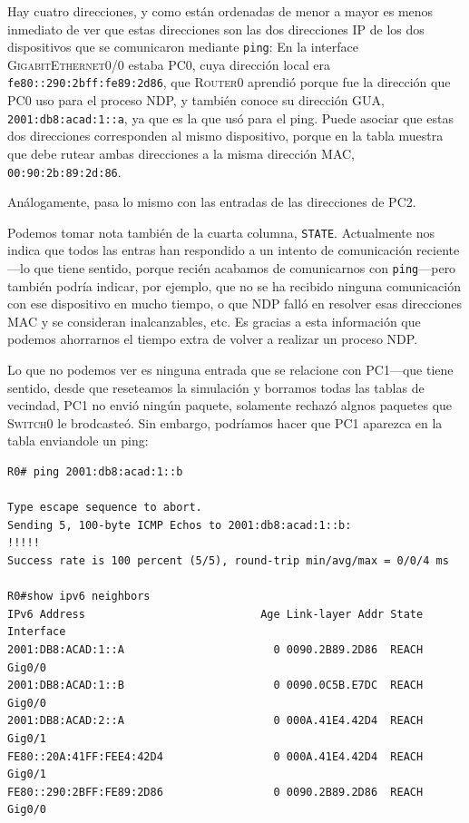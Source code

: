 \documentclass[a4paper,10pt]{corsage}
\makeatletter
\newcommand{\ipaddress}[1]{\texttt{#1}}
\newcommand{\macaddress}[1]{\ipaddress{#1}}
\newcommand{\devname}[1]{\textsc{#1}}
\newcommand*{\@doendeq}{%
	\everypar{{\setbox\z@\lastbox}\everypar{}}%
}
\newenvironment{console}{%
	\begin{tcolorbox}[
		left skip=1cm,
		right skip=1Cm,
		left=8pt,
		right=8pt,
		top=2.5\parskip,
		bottom=2\parskip,
		colback=gray!10,
		colframe=gray!40,
		boxrule=0pt,
		leftrule=4pt,
		sharp corners=all,
		fontupper=\ttfamily\flushleft\footnotesize
	]%
}{%
	\end{tcolorbox}%
	\ignorespacesafterend\par\noindent\aftergroup\@doendeq%
}
\makeatother
\begin{document}
		Hay cuatro direcciones, y como están ordenadas de menor a mayor es menos inmediato de ver que estas direcciones son las dos direcciones IP de los dos dispositivos que se comunicaron mediante \texttt{ping}:  En la interface \devname{GigabitEthernet0/0} estaba \devname{PC0}, cuya dirección local era \ipaddress{fe80::290:2bff:fe89:2d86}, que \devname{Router0} aprendió porque fue la dirección que \devname{PC0} uso para el proceso NDP, y también conoce su dirección GUA, \ipaddress{2001:db8:acad:1::a}, ya que es la que usó para el ping.  Puede asociar que estas dos direcciones corresponden al mismo dispositivo, porque en la tabla muestra que debe rutear ambas direcciones a la misma dirección MAC, \macaddress{00:90:2b:89:2d:86}.

		Análogamente, pasa lo mismo con las entradas de las direcciones de \devname{PC2}.

		Podemos tomar nota también de la cuarta columna, \texttt{STATE}.  Actualmente nos indica que todos las entras han respondido a un intento de comunicación reciente---lo que tiene sentido, porque recién acabamos de comunicarnos con \texttt{ping}---pero también podría indicar, por ejemplo, que no se ha recibido ninguna comunicación con ese dispositivo en mucho tiempo, o que NDP falló en resolver esas direcciones MAC y se consideran inalcanzables, etc.  Es gracias a esta información que podemos ahorrarnos el tiempo extra de volver a realizar un proceso NDP.

		Lo que no podemos ver es ninguna entrada que se relacione con \devname{PC1}---que tiene sentido, desde que reseteamos la simulación y borramos todas las tablas de vecindad, \devname{PC1} no envió ningún paquete, solamente rechazó algnos paquetes que \devname{Switch0} le brodcasteó.  Sin embargo, podríamos hacer que \devname{PC1} aparezca en la tabla enviandole un ping:
		\begin{console}
			\begin{verbatim}R0# ping 2001:db8:acad:1::b

Type escape sequence to abort.
Sending 5, 100-byte ICMP Echos to 2001:db8:acad:1::b:
!!!!!
Success rate is 100 percent (5/5), round-trip min/avg/max = 0/0/4 ms

R0#show ipv6 neighbors
IPv6 Address                           Age Link-layer Addr State Interface
2001:DB8:ACAD:1::A                       0 0090.2B89.2D86  REACH Gig0/0
2001:DB8:ACAD:1::B                       0 0090.0C5B.E7DC  REACH Gig0/0
2001:DB8:ACAD:2::A                       0 000A.41E4.42D4  REACH Gig0/1
FE80::20A:41FF:FEE4:42D4                 0 000A.41E4.42D4  REACH Gig0/1
FE80::290:2BFF:FE89:2D86                 0 0090.2B89.2D86  REACH Gig0/0\end{verbatim}
		\end{console}
\end{document}
